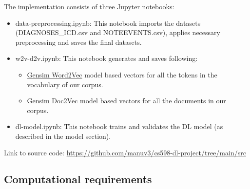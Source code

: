 \documentclass[11pt,a4paper]{article}
\begin{document}
The implementation consists of three Jupyter notebooks:
\begin{itemize}
    \item data-preprocessing.ipynb: This notebook imports the datasets (DIAGNOSES\_ICD.csv and NOTEEVENTS.csv), applies necessary preprocessing and saves the final datasets.
    \item w2v-d2v.ipynb: This notebook generates and saves following:
	\begin{itemize}
		\item \href{https://radimrehurek.com/gensim/models/word2vec.html}{Gensim Word2Vec} model based vectors for all the tokens in the vocabulary of our corpus.
		\item \href{https://radimrehurek.com/gensim/models/doc2vec.html}{Gensim Doc2Vec} model based vectors for all the documents in our corpus.
	\end{itemize}
	\item dl-model.ipynb: This notebook trains and validates the DL model (as described in the model section).
\end{itemize}

Link to source code: \url{https://github.com/manuv3/cs598-dl-project/tree/main/src}


\subsection{Computational requirements}
\end{document}
